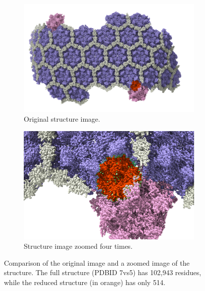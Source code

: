 \documentclass[11pt,a4paper]{article}
\begin{document}
\begin{figure}[ht]
    \centering
    \begin{subfigure}[b]{0.45\textwidth}
        \includegraphics[width=\textwidth]{Figures/Full_image.png}
        \caption{Original structure image.}
        \label{fig:full_image}
    \end{subfigure}
    \hfill
    \begin{subfigure}[b]{0.45\textwidth}
        \includegraphics[width=\textwidth]{Figures/zoom_4.png}
        \caption{Structure image zoomed four times.}
        \label{fig:zoom_4}
    \end{subfigure}
    \caption{Comparison of the original image and a zoomed image of the structure. The full structure (PDBID 7vs5) has 102,943 residues, while the reduced structure (in orange) has only 514.}
    \label{fig:comparison}
\end{figure}
\end{document}
